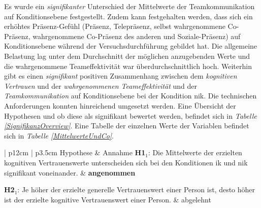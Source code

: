 \documentclass[a4paper,11pt]{article}%
\renewcommand{\\}{\vspace*{0.5\baselineskip} \newline}
\begin{document}
{{Es wurde ein \textit{signifikanter} Unterschied der Mittelwerte der Teamkommunikation auf Konditionsebene festgestellt. Zudem kann festgehalten werden, dass sich ein erhöhtes Präsenz-Gefühl (Präsenz, Telepräsenz, selbst wahrgenommene Co-Präsenz, wahrgenommene Co-Präsenz des anderen und Soziale-Präsenz) auf Konditionsebene während der Versuchsdurchführung gebildet hat. Die allgemeine Belastung lag unter dem Durchschnitt der möglichen anzugebenden Werte und die wahrgenommene Teameffektivität war überdurchschnittlich hoch.
Weiterhin gibt es einen \textit{signifikant} positiven Zusammenhang zwischen dem \textit{kognitiven Vertrauen} und der \textit{wahrgenommenen Teameffektivität} und der \textit{Teamkommunikation} auf Konditionsebene bei der Kondition \ac{nik}.
Die technischen Anforderungen konnten hinreichend umgesetzt werden.
Eine Übersicht der Hypothesen und ob diese als signifikant bewertet werden, befindet sich in \textit{Tabelle \ref{SignifikanzOverview}}. Eine Tabelle der einzelnen Werte der Variablen befindet sich in \textit{Tabelle \ref{MittelwerteUndCo}}.

\begin{table}[H]
	\centering\footnotesize{}
	\caption[Annahme und Ablehnung der Hypothesen]{Diese Tabelle zeigt, ob eine Hypothese angenommen oder abgelehnt wurde.}
	\label{SignifikanzOverview}
	\begin{tabularx}{\textwidth}{| p{12cm} | p{3.5cm}} 
		Hypothese & Annahme  \\
		\hline \\
\textbf{H1$_{1}$}: Die Mittelwerte der erzielten kognitiven Vertrauenswerte unterscheiden sich bei den Konditionen \ac{ik} und \ac{nik} signifikant voneinander.\\
		& \textbf{angenommen} \\
		\hline \\
		
				\textbf{H2$_{1}$}: Je höher der erzielte generelle Vertrauenswert einer Person ist, desto höher ist der erzielte kognitive Vertrauenswert einer Person. \\
		& abgelehnt \\
		

\end{tabularx}
\end{table}}}
\end{document}
